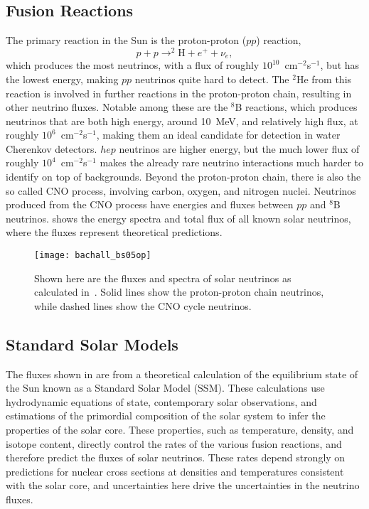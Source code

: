\subsection{Fusion Reactions}

The primary reaction in the Sun is the proton-proton ($pp$) reaction,
\begin{equation}
p+p \rightarrow ^2\mathrm{H}+e^++\nu_e,
\end{equation}
which produces the most neutrinos, with a flux of roughly $10^{10}$~cm$^{-2}$s$^{-1}$, but has the lowest energy, making $pp$ neutrinos quite hard to detect.
The $^2$He from this reaction is involved in further reactions in the proton-proton chain, resulting in other neutrino fluxes.
Notable among these are the $^8$B reactions, which produces neutrinos that are both high energy, around 10~MeV, and relatively high flux, at roughly $10^6$~cm$^{-2}$s$^{-1}$, making them an ideal candidate for detection in water Cherenkov detectors.
$hep$ neutrinos are higher energy, but the much lower flux of roughly $10^4$~cm$^{-2}$s$^{-1}$ makes the already rare neutrino interactions much harder to identify on top of backgrounds.
Beyond the proton-proton chain, there is also the so called CNO process, involving carbon, oxygen, and nitrogen nuclei. 
Neutrinos produced from the CNO process have energies and fluxes between $pp$ and $^8$B neutrinos.
 shows the energy spectra and total flux of all known solar neutrinos, where the fluxes represent theoretical predictions.

\begin{figure}
\centering
\texttt{[image: bachall\_bs05op]}
\caption{\label{neutrino_spectra}Shown here are the fluxes and spectra of solar neutrinos as calculated in~\cite{bs05op}.
Solid lines show the proton-proton chain neutrinos, while dashed lines show the CNO cycle neutrinos.}
\end{figure}

\subsection{Standard Solar Models}

The fluxes shown in  are from a theoretical calculation of the equilibrium state of the Sun known as a Standard Solar Model (SSM).
These calculations use hydrodynamic equations of state, contemporary solar observations, and estimations of the primordial composition of the solar system to infer the properties of the solar core.
These properties, such as temperature, density, and isotope content, directly control the rates of the various fusion reactions, and therefore predict the fluxes of solar neutrinos.
These rates depend strongly on predictions for nuclear cross sections at densities and temperatures consistent with the solar core, and uncertainties here drive the uncertainties in the neutrino fluxes.

